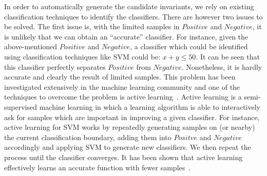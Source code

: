 In order to automatically generate the candidate invariants, we rely on existing classification techniques to identify the classifiers. There are however two issues to be solved. The first issue is, with the limited samples in $Positive$ and $Negative$, it is unlikely that we can obtain an ``accurate'' classifier. For instance, given the above-mentioned $Positive$ and $Negative$, a classifier which could be identified using classification techniques like SVM could be: $x+y \leq 50$. It can be seen that this classifier perfectly separates $Positive$ from $Negative$. Nonetheless, it is hardly accurate and clearly the result of limited samples. This problem has been investigated extensively in the machine learning community and one of the techniques to overcome the problem is active learning~\cite{active}. Active learning is a semi-supervised machine learning in which a learning algorithm is able to interactively ask for samples which are important in improving a given classifier. For instance, active learning for SVM works by repeatedly generating samples on (or nearby) the current classification boundary, adding them into $Positve$ and $Negative$ accordingly and applying SVM to generate new classifiers. We then repeat the process until the classifier converges. It has been shown that active learning effectively learns an accurate function with fewer samples~\cite{DBLP:conf/icml/SchohnC00}.


